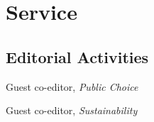 \documentclass[12pt,letterpaper]{report}
\begin{document}
    \section*{Service}

      \subsection*{Editorial Activities}

    \begin{tablist}
    	\setlength\itemsep{2pt}
		 \item [2022-2024] \tab Guest co-editor, \textit{Public Choice} \\
    		\item [2022-2023] \tab Guest co-editor, \textit{Sustainability} \\
    \end{tablist}
\end{document}
